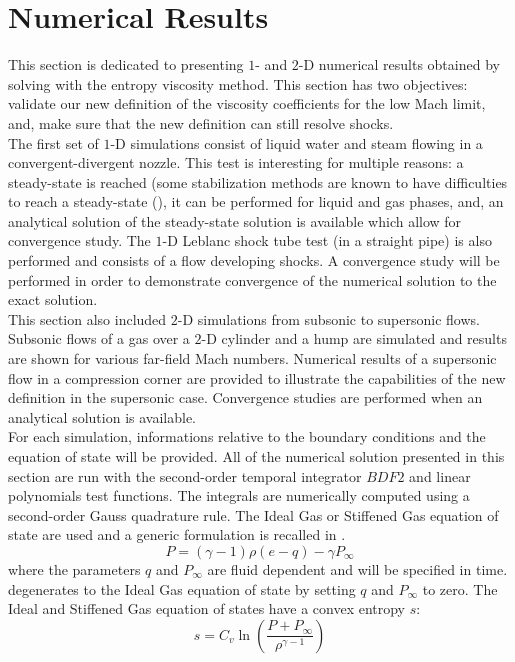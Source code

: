\section{Numerical Results} \label{sec:results}
This section is dedicated to presenting $1$- and $2$-D numerical results obtained by solving  with the entropy viscosity method. This section has two objectives: validate our new definition of the viscosity coefficients for the low Mach limit, and, make sure that the new definition can still resolve shocks.\\
The first set of $1$-D simulations consist of liquid water and steam flowing in a convergent-divergent nozzle. This test is interesting for multiple reasons: a steady-state is reached (some stabilization methods are known to have difficulties to reach a steady-state (\cite{FluxLimiter, FluxLimiter2}), it can be performed for liquid and gas phases, and, an analytical solution of the steady-state solution is available which allow for convergence study. The $1$-D Leblanc shock tube test \cite{Leblanc} (in a straight pipe) is also performed and consists of a flow developing shocks. A convergence study will be performed in order to demonstrate convergence of the numerical solution to the exact solution.\\ 
This section also included $2$-D simulations from subsonic to supersonic flows. Subsonic flows of a gas over a $2$-D cylinder and a hump \cite{Hump} are simulated and results are shown for various far-field Mach numbers. Numerical results of a supersonic flow in a compression corner are provided to illustrate the capabilities of the new definition in the supersonic case. Convergence studies are performed when an analytical solution is available. \\
For each simulation, informations relative to the boundary conditions and the equation of state will be provided. All of the numerical solution presented in this section are run with the second-order temporal integrator $BDF2$ and linear polynomials test functions. The integrals are numerically computed using a second-order Gauss quadrature rule. The Ideal Gas \cite{IGEOS} or Stiffened Gas equation of state \cite{SGEOS} are used and a generic formulation is recalled in .
\begin{equation}
\label{eq:eos}
P = (\gamma-1) \rho (e-q) - \gamma P_{\infty}
\end{equation}
where the parameters $q$ and $P_{\infty}$ are fluid dependent and will be specified in time.  degenerates to the Ideal Gas equation of state by setting $q$ and $P_{\infty}$ to zero. The Ideal and Stiffened Gas equation of states have a convex entropy $s$:
\begin{equation}
s = C_v \ln \left( \frac{P+P_{\infty}}{\rho^{\gamma-1}} \right) \nonumber
\end{equation}
